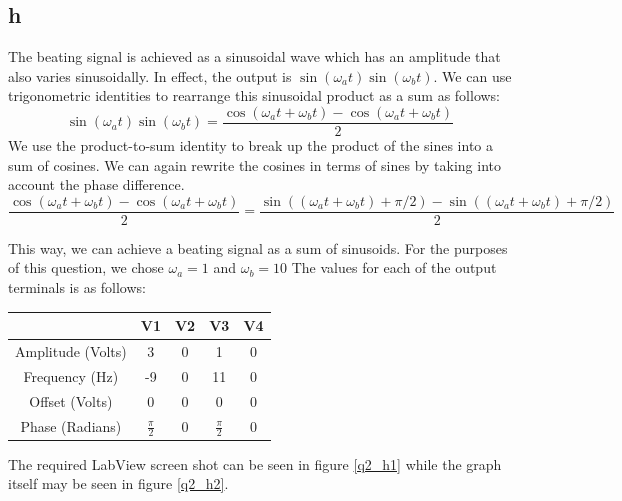 \documentclass{article}
\theoremstyle{plain}
\theoremstyle{definition}
\theoremstyle{remark}
\begin{document}
\subsection*{h} 
The beating signal is achieved as a sinusoidal wave which has an amplitude that also varies sinusoidally. In effect, the output is $\sin(\omega_a t)\sin(\omega_b t) $. We can use trigonometric identities to rearrange this sinusoidal product as a sum as follows:
$$\sin(\omega_a t)\sin(\omega_b t) = \frac{\cos(\omega_a t + \omega_b t) - \cos(\omega_a t + \omega_b t)}{2}$$
We use the product-to-sum identity to break up the product of the sines into a sum of cosines. We can again rewrite the cosines in terms of sines by taking into account the phase difference.
$$\frac{\cos(\omega_a t + \omega_b t) - \cos(\omega_a t + \omega_b t)}{2} = \frac{\sin((\omega_a t + \omega_b t) + \pi/2)- \sin((\omega_a t + \omega_b t) + \pi/2)}{2}$$

This way, we can achieve a beating signal as a sum of sinusoids. For the purposes of this question, we chose $\omega_a = 1$ and $\omega_b = 10$ The values for each of the output terminals is as follows:
\begin{table}[hbt]
\begin{center}
    \begin{tabular}{|c||c|c|c|c|}
        \hline
        ~                 & V1              & V2 & V3              & V4 \\ \hline \hline
        Amplitude (Volts) & 3               & 0  & 1               & 0  \\ \hline
        Frequency (Hz)    & -9              & 0  & 11              & 0  \\ \hline
        Offset (Volts)    & 0               & 0  & 0               & 0  \\ \hline
        Phase (Radians)            & $\frac{\pi}{2}$ & 0  & $\frac{\pi}{2}$ & 0  \\
        \hline
    \end{tabular}
\end{center}
\end{table}

The required LabView screen shot can be seen in figure \ref{q2_h1} while the graph itself may be seen in figure \ref{q2_h2}.
\end{document}
